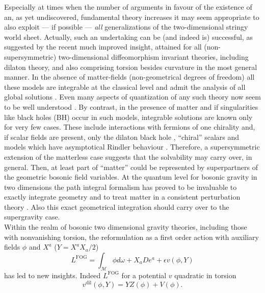 \documentclass[a4paper,10pt]{article}
\newcommand{\BMf}{\mathcal{M}}
\newcommand{\Action}{L}
\renewcommand{\^}{{}^}
\renewcommand{\_}{\!{}_}
\begin{document}
Especially at times when the number of arguments in favour of the
existence of an, as yet undiscovered, fundamental theory 
increases 
\cite{Vafa:1996xn} it may seem appropriate to also exploit --- if
possible --- \emph{all}  generalizations of the
two-dimensional stringy world sheet. Actually, such an undertaking can
be (and indeed is) successful, as suggested by the recent much
improved insight, attained for all (non-supersymmetric)
two-dimensional diffeomorphism invariant theories, including dilaton
theory, and also comprising torsion besides curvature \cite{Katanaev:1986wk} 
in the most general manner. In the absence of
matter-fields (non-geometrical degrees of freedom) all these models
are integrable at the classical level and admit the analysis of all
global solutions \cite{Katanaev:1993fu}. 
 Even many aspects of quantization
of any such theory now seem to be well understood
\cite{Kummer:1997hy}. 
By contrast, in the presence of matter and if singularities like black
holes (BH) occur in such models, integrable solutions are known only for
very few cases. These include interactions with fermions of one
chirality \cite{kummer92} and, if scalar fields are present, only the
dilaton black hole \cite{Mandal:1991tz}, ``chiral'' scalars 
\cite{Strobl:1998ch} and models which have
asymptotical Rindler behaviour \cite{Fabbri:1996bz}.  Therefore, a
supersymmetric extension of the matterless case suggests that the
solvability may carry over, in general. Then, at least part 
of  ``matter'' could be
represented by superpartners of the geometric bosonic field 
variables. At the quantum level for bosonic gravity in two 
dimensions the path integral formalism has proved 
to be invaluable to exactly integrate geometry and to treat 
matter in a consistent perturbation theory \cite{Kummer:1997jj}. 
Also this exact geometrical integration should carry over to 
the supergravity case.\\ 
Within the realm of bosonic two dimensional gravity theories, 
including those with nonvanishing torsion, the reformulation 
as a first order action \cite{Schaller:1994es,Strobl:1999Habil} 
 with auxiliary fields 
$\phi$ and $X^a$ ($ Y =  X^aX_a/2$) 
\begin{equation}
  \Action^\mathrm{FOG} = \int_\BMf \phi d\omega + X_a De^a + \epsilon
  v(\phi,Y) 
  \label{FOG}
\end{equation}
has led to new insights. Indeed $\Action^\mathrm{FOG}$ for 
a potential $v$ quadratic in torsion
\begin{equation}
  \label{vdil}
  v^{\mathrm{dil}}(\phi,Y) = Y Z(\phi) + V(\phi).
\end{equation}
\end{document}
